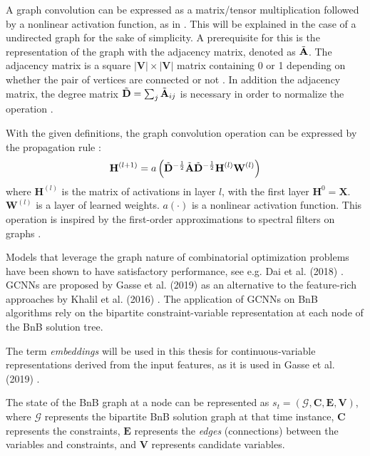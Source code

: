 A graph convolution can be expressed as a matrix/tensor multiplication followed by a nonlinear activation function, as in . This will be explained in the case of a undirected graph for the sake of simplicity. A prerequisite for this is the representation of the graph with the adjacency matrix, denoted as $\Tilde{\mathbf{A}}$. The adjacency matrix is a square $|\mathbf{V}|\times|\mathbf{V}|$ matrix containing 0 or 1 depending on whether the pair of vertices are connected or not \cite{kipf2016semisupervised}. In addition the adjacency matrix, the degree matrix $\Tilde{\mathbf{D}} = \sum_j \Tilde{\mathbf{A}}_{i j}$ is necessary in order to normalize the operation \cite{kipf2016semisupervised}.

With the given definitions, the graph convolution operation can be expressed by the propagation rule \cite{kipf2016semisupervised}:
\begin{equation}
    \mathbf{H}^{(l+1)} = a \left( \Tilde{\mathbf{D}}^{-\frac{1}{2}} \Tilde{\mathbf{A}} \Tilde{\mathbf{D}}^{-\frac{1}{2}} \mathbf{H}^{(l)}\mathbf{W}^{(l)}\right)
\end{equation}
where $\mathbf{H}^{(l)}$ is the matrix of activations in layer $l$, with the first layer $\mathbf{H}^{0}=\mathbf{X}$.  $\mathbf{W}^{(l)}$ is a layer of learned weights. $a( \cdot) $ is a nonlinear activation function.
This operation is inspired by the first-order approximations to spectral filters on graphs \cite{kipf2016semisupervised}.





Models that leverage the graph nature of combinatorial optimization problems have been shown to have satisfactory performance, see e.g. Dai et al. (2018) \cite{dai2018learning}. 
\gls{GCNN}s are proposed by Gasse et al. (2019) \cite{gasse2019exact} as an alternative to the feature-rich approaches by Khalil et al. (2016) \cite{khalil2016learning}. 
The application of \gls{GCNN}s on \gls{BnB} algorithms rely on the bipartite constraint-variable representation at each node of the \gls{BnB} solution tree.


The term \textit{embeddings} will be used in this thesis for continuous-variable representations derived from the input features, as it is used in Gasse et al. (2019) \cite{gasse2019exact}. 


The state of the \gls{BnB} graph at a node can be represented as $s_t = (\mathcal{G}, \mathbf{C}, \mathbf{E}, \mathbf{V})$, where $\mathcal{G}$ represents the bipartite \gls{BnB} solution graph at that time instance, $\mathbf{C}$ represents the constraints, $\mathbf{E}$ represents the \textit{edges} (connections) between the variables and constraints, and $\mathbf{V}$ represents candidate variables.  


